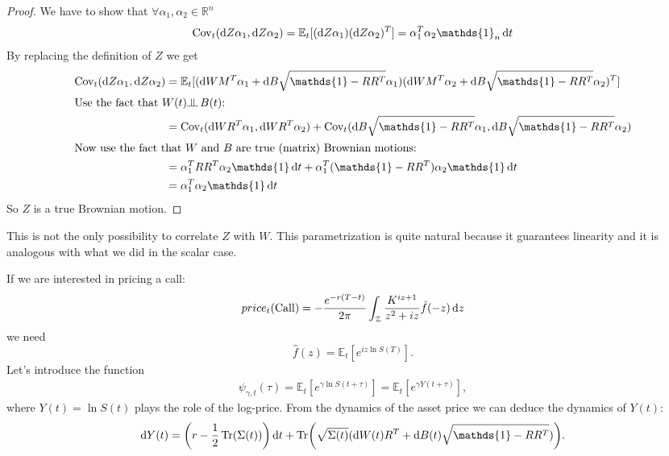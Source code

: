 \begin{proof}
    We have to show that $\forall \alpha_1,\alpha_2\in\mathbb{R}^n$
    \begin{align*}
        \Cov_t(\dd Z\alpha_1, \dd Z\alpha_2) = \mathbb{E}_t[(\dd Z\alpha_1)(\dd Z\alpha_2)^T] = \alpha_1^T\alpha_2\mathds{1}_n\,\dd t
    \end{align*}
    By replacing the definition of $Z$ we get
    \begin{align*}
        \Cov_t(\dd Z\alpha_1, \dd Z\alpha_2) &= \mathbb{E}_t[(\dd WM^T\alpha_1 + \dd B\sqrt{\mathds{1}-RR^T}\alpha_1)(\dd WM^T\alpha_2 + \dd B\sqrt{\mathds{1}-RR^T}\alpha_2)^T] \\
        \intertext{Use the fact that $W(t)\indep\, B(t)$:}
        &=
        \Cov_t(\dd WR^T\alpha_1, \dd WR^T\alpha_2) + \Cov_t(\dd B\sqrt{\mathds{1}-RR^T}\alpha_1, \dd B\sqrt{\mathds{1}-RR^T}\alpha_2) \\
        \intertext{Now use the fact that $W$ and $B$ are true (matrix) Brownian motions:}
        &=
        \alpha_1^T RR^T \alpha_2\mathds{1}\,\dd t + \alpha_1^T(\mathds{1}-RR^T)\alpha_2\mathds{1}\,\dd t \\
        &=
        \alpha_1^T\alpha_2\mathds{1}\,\dd t
    \end{align*}
    So $Z$ is a true Brownian motion.
\end{proof}
\begin{remark}
    This is not the only possibility to correlate $Z$ with $W$. This parametrization is quite natural because it guarantees linearity and it is analogous with what we did in the scalar case.
\end{remark}
If we are interested in pricing a call:
\begin{align*}
    price_t(\operatorname{Call}) = -\frac{e^{-r(T-t)}}{2\pi}\int_{\mathcal{Z}}\frac{K^{iz+1}}{z^2+iz}\hat{f}(-z)\,\dd z
\end{align*}
we need
\begin{equation*}
    \hat{f}(z) = \mathbb{E}_t[e^{iz\ln S(T)}].
\end{equation*}
Let's introduce the function
\begin{align}
    \psi_{\gamma, t}(\tau) = \mathbb{E}_t\left[e^{\gamma\ln S(t+\tau)}\right] = \mathbb{E}_t\left[e^{\gamma Y(t+\tau)}\right],
\end{align}
where $Y(t) = \ln S(t)$ plays the role of the log-price. From the dynamics of the asset price we can deduce the dynamics of $Y(t)$:
\begin{equation*}
    \dd Y(t) = \left(r-\frac{1}{2}\Tr(\Sigma(t))\right)\dd t + \Tr(\sqrt{\Sigma(t)}(\dd W(t)R^T+\dd B(t)\sqrt{\mathds{1}-RR^T})).
\end{equation*}
